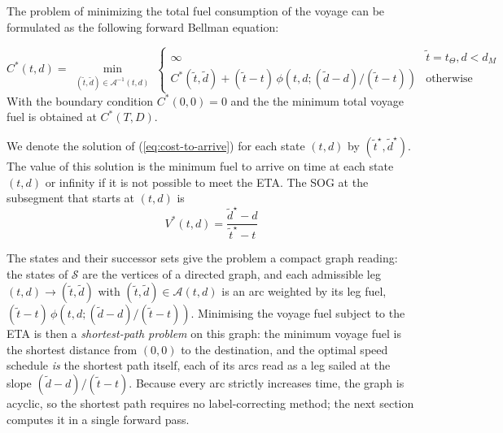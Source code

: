 \documentclass[review,authoryear]{elsarticle}
\begin{document}
The problem of minimizing the total fuel consumption of the voyage can be formulated as the following forward Bellman equation:


\begin{equation}
\label{eq:cost-to-arrive}
C^{*}(t,d)=\min_{\substack{(\tilde t,\tilde d) \in\mathcal{A}^{-1}( t, d)}}   \begin{cases}     \infty & \tilde t =  t_{\Theta} , d < d_M \\
	C^{*}(\tilde t,\tilde d)+(\tilde t- t)\,\phi(t,d; (\tilde d- d)/(\tilde t-t))  & \text{otherwise}
\end{cases}
\end{equation}
With the boundary condition $C^*(0,0) = 0$ and the the minimum total voyage fuel is obtained at $C^{*}(T,D)$.

We denote the solution of (\ref{eq:cost-to-arrive}) for each  state $(t,d)$ by  $(\tilde t^{\star},\tilde d^{\star})$. The value of this solution is
the minimum fuel to arrive on time at each state $(t,d)$ or infinity if it is not possible to meet the ETA. The SOG at the subsegment that starts at $(t,d)$ is
\begin{equation}
	\label{eq:opt-speed} V^{*}(t,d)= \frac{\tilde d^{\star} - d}{\tilde t^{\star} -t}
\end{equation}





The states and their successor sets give the problem a compact graph reading: the states of
$\mathcal{S}$ are the vertices of a directed graph, and each admissible leg
$(t,d)\to(\tilde t,\tilde d)$ with $(\tilde t,\tilde d)\in\mathcal{A}(t,d)$ is an arc weighted by
its leg fuel, $(\tilde t-t)\,\phi(t,d;(\tilde d-d)/(\tilde t-t))$. Minimising the voyage fuel
subject to the ETA is then a \emph{shortest-path problem} on this graph: the minimum voyage fuel is
the shortest distance from $(0,0)$ to the destination, and the optimal speed schedule \emph{is} the
shortest path itself, each of its arcs read as a leg sailed at the slope
$(\tilde d-d)/(\tilde t-t)$. Because every arc strictly increases time, the graph is acyclic, so the
shortest path requires no label-correcting method; the next section computes it in a single forward
pass.
\end{document}
